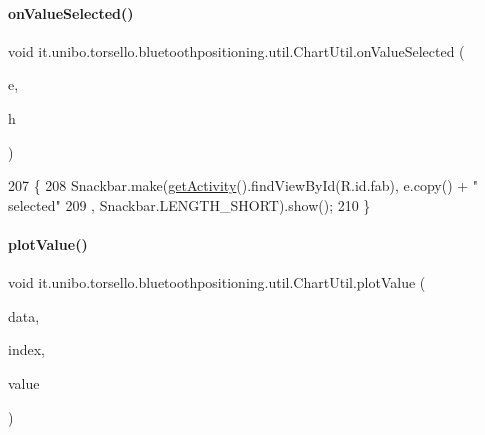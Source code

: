 \paragraph{\texorpdfstring{on\+Value\+Selected()}{onValueSelected()}}
{\footnotesize\ttfamily void it.\+unibo.\+torsello.\+bluetoothpositioning.\+util.\+Chart\+Util.\+on\+Value\+Selected (\begin{DoxyParamCaption}\item[{Entry}]{e,  }\item[{Highlight}]{h }\end{DoxyParamCaption})}


\begin{DoxyCode}
207                                                       \{
208         Snackbar.make(\hyperlink{classit_1_1unibo_1_1torsello_1_1bluetoothpositioning_1_1util_1_1ChartUtil_a59150a6d20b6d0ad2fcf8c1ba858d355_a59150a6d20b6d0ad2fcf8c1ba858d355}{getActivity}().findViewById(R.id.fab), e.copy() + \textcolor{stringliteral}{" selected"}
209                 , Snackbar.LENGTH\_SHORT).show();
210     \}
\end{DoxyCode}
\hypertarget{classit_1_1unibo_1_1torsello_1_1bluetoothpositioning_1_1util_1_1ChartUtil_a86398d4aca978fbfc10c71039191635e_a86398d4aca978fbfc10c71039191635e}{}\label{classit_1_1unibo_1_1torsello_1_1bluetoothpositioning_1_1util_1_1ChartUtil_a86398d4aca978fbfc10c71039191635e_a86398d4aca978fbfc10c71039191635e} 
\paragraph{\texorpdfstring{plot\+Value()}{plotValue()}}
{\footnotesize\ttfamily void it.\+unibo.\+torsello.\+bluetoothpositioning.\+util.\+Chart\+Util.\+plot\+Value (\begin{DoxyParamCaption}\item[{Line\+Data}]{data,  }\item[{int}]{index,  }\item[{Double}]{value }\end{DoxyParamCaption})\hspace{0.3cm}{\ttfamily [private]}}


